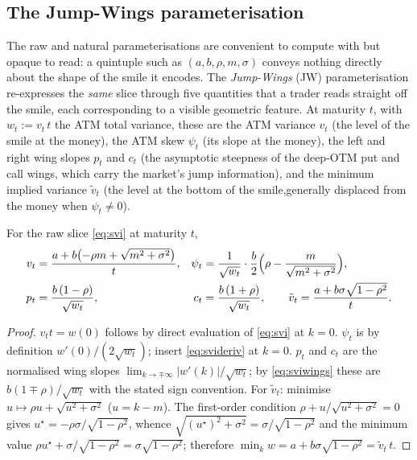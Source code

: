 \subsection{The Jump-Wings parameterisation}

The raw and natural parameterisations are convenient to compute with but opaque to read: a quintuple such as $(a,b,\rho,m,\sigma)$ conveys nothing directly about the shape of the smile it
encodes. The \emph{Jump-Wings} (JW) parameterisation \cite{gatheraljacquier2014} re-expresses
the \emph{same} slice through five quantities that a trader reads straight off the smile, each
corresponding to a visible geometric feature. At maturity $t$, with $w_t:=v_t\,t$ the ATM total
variance, these are the ATM variance $v_t$ (the level of the smile at the money), the ATM skew
$\psi_t$ (its slope at the money), the left and right wing slopes $p_t$ and $c_t$ (the asymptotic
steepness of the deep-OTM put and call wings, which carry the market's jump information), and the minimum implied variance $\tilde v_t$ (the level at the bottom of the smile,generally displaced from the money when $\psi_t\neq0$). 

\begin{lemma}\label{lem:jw}
For the raw slice \eqref{eq:svi} at maturity $t$,
\begin{equation}\label{eq:jw}
\begin{aligned}
v_t&=\frac{a+b\bigl(-\rho m+\sqrt{m^2+\sigma^2}\bigr)}{t},
&\psi_t&=\frac{1}{\sqrt{w_t}}\cdot\frac{b}{2}\Bigl(\rho-\frac{m}{\sqrt{m^2+\sigma^2}}\Bigr),\\
p_t&=\frac{b\,(1-\rho)}{\sqrt{w_t}},
&c_t&=\frac{b\,(1+\rho)}{\sqrt{w_t}},\qquad
\tilde v_t=\frac{a+b\sigma\sqrt{1-\rho^2}}{t}.
\end{aligned}
\end{equation}
\end{lemma}

\begin{proof}
$v_t t=w(0)$ follows by direct evaluation of \eqref{eq:svi} at $k=0$. $\psi_t$ is by
definition $w'(0)/(2\sqrt{w_t})$; insert \eqref{eq:svideriv} at $k=0$. $p_t$ and $c_t$ are the
normalised wing slopes $\lim_{k\to\mp\infty}|w'(k)|/\sqrt{w_t}$; by \eqref{eq:sviwings} these
are $b(1\mp\rho)/\sqrt{w_t}$ with the stated sign convention. For $\tilde v_t$: minimise
$u\mapsto\rho u+\sqrt{u^2+\sigma^2}$ ($u=k-m$). The first-order condition
$\rho+u/\sqrt{u^2+\sigma^2}=0$ gives $u^\star=-\rho\sigma/\sqrt{1-\rho^2}$, whence
$\sqrt{(u^\star)^2+\sigma^2}=\sigma/\sqrt{1-\rho^2}$ and the minimum value
$\rho u^\star+\sigma/\sqrt{1-\rho^2}=\sigma\sqrt{1-\rho^2}$; therefore
$\min_kw=a+b\sigma\sqrt{1-\rho^2}=\tilde v_t\,t$.
\end{proof}

